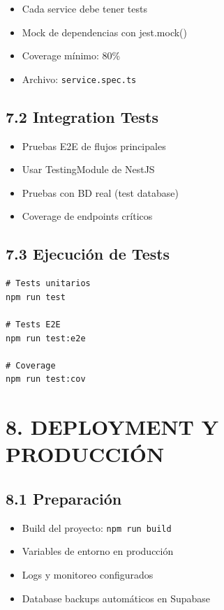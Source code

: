 \documentclass[12pt,a4paper]{article}
\begin{document}
\begin{itemize}
    \item Cada service debe tener tests
    \item Mock de dependencias con jest.mock()
    \item Coverage mínimo: 80\%
    \item Archivo: \texttt{service.spec.ts}
\end{itemize}

\subsection{7.2 Integration Tests}

\begin{itemize}
    \item Pruebas E2E de flujos principales
    \item Usar TestingModule de NestJS
    \item Pruebas con BD real (test database)
    \item Coverage de endpoints críticos
\end{itemize}

\subsection{7.3 Ejecución de Tests}

\begin{verbatim}
# Tests unitarios
npm run test

# Tests E2E
npm run test:e2e

# Coverage
npm run test:cov
\end{verbatim}

\section{8. DEPLOYMENT Y PRODUCCIÓN}

\subsection{8.1 Preparación}

\begin{itemize}
    \item Build del proyecto: \texttt{npm run build}
    \item Variables de entorno en producción
    \item Logs y monitoreo configurados
    \item Database backups automáticos en Supabase
\end{itemize}
\end{document}
